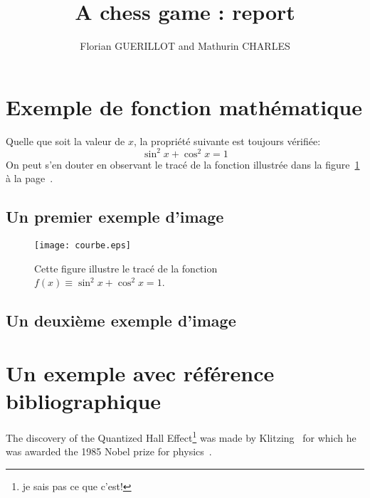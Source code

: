 \documentclass{article}           %
\title{A chess game : report}     %
\author{Florian GUERILLOT and Mathurin CHARLES}        %
\begin{document}

\maketitle                        %
\newpage
\tableofcontents                  %
\newpage
\section{Exemple de fonction mathématique}            %
Quelle que soit la valeur de $x$,
la propriété suivante est toujours
vérifiée: $$\sin^2 x+\cos^2 x=1$$
On peut s'en douter en observant
le tracé de la fonction illustrée
dans la figure~\ref{courbe}
à la page~\pageref{courbe}.
\newpage
\subsection{Un premier exemple d'image}
\begin{figure}[htbp]
\centering
\texttt{[image: courbe.eps]}
\caption{Cette figure illustre
le tracé de la fonction
$f(x)\equiv\sin^2 x+\cos^2 x=1$.}
\label{courbe}
\end{figure}
\newpage
\subsection{Un deuxième exemple d'image}
\begin{figure}[htbp]
\centering
{}
\end{figure}

\section{Un exemple avec référence bibliographique}
The discovery of the Quantized Hall Effect\footnote{je sais pas ce que c'est!} was made by
Klitzing~\cite{qhe} for which he was awarded the 1985 Nobel
prize for physics~\cite{nobel}.
\end{document}
